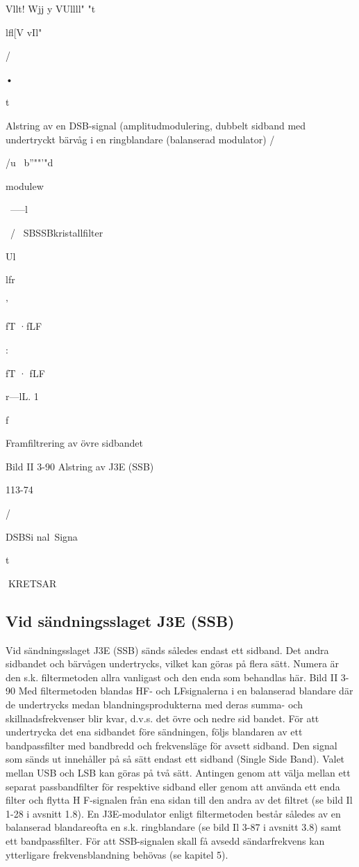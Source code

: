 Vllt! Wjj y VUllll" "t{lfl[V vIl"

/

•

t

Alstring av en DSB-signal (amplitudmodulering, dubbelt sidband med undertryckt bärvåg
i en ringblandare (balanserad modulator)
/

/u~
b''""'"d

modulew

~-----l

~/ ~SBSSBkristallfilter

Ul

lfr

'

fT ·fLF

:

fT · fLF

r---lL. 1

f

Framfiltrering av övre sidbandet

Bild II 3-90 Alstring av J3E (SSB)

113-74

/

DSBSi nal~Signa~

t

KRETSAR
\subsection{Vid sändningsslaget J3E (SSB)}

Vid sändningsslaget J3E (SSB) sänds
således endast ett sidband. Det andra sidbandet och bärvågen undertrycks, vilket kan
göras på flera sätt. Numera är den s.k.
filtermetoden allra vanligast och den enda
som behandlas här.
Bild II 3-90
Med filtermetoden blandas HF- och LFsignalerna i en balanserad blandare där de
undertrycks medan blandningsprodukterna
med deras summa- och skillnadsfrekvenser
blir kvar, d.v.s. det övre och nedre sid bandet.
För att undertrycka det ena sidbandet
före sändningen, följs blandaren av ett bandpassfilter med bandbredd och frekvensläge
för avsett sidband. Den signal som sänds ut
innehåller på så sätt endast ett sidband
(Single Side Band).
Valet mellan USB och LSB kan göras på
två sätt. Antingen genom att välja mellan ett
separat passbandfilter för respektive sidband eller genom att använda ett enda filter
och flytta H F-signalen från ena sidan till den
andra av det filtret (se bild Il 1-28 i avsnitt
1.8).
En J3E-modulator enligt filtermetoden
består således av en balanserad blandareofta en s.k. ringblandare (se bild Il 3-87 i
avsnitt 3.8) samt ett bandpassfilter.
För att SSB-signalen skall få avsedd sändarfrekvens kan ytterligare frekvensblandning behövas (se kapitel 5).

}
